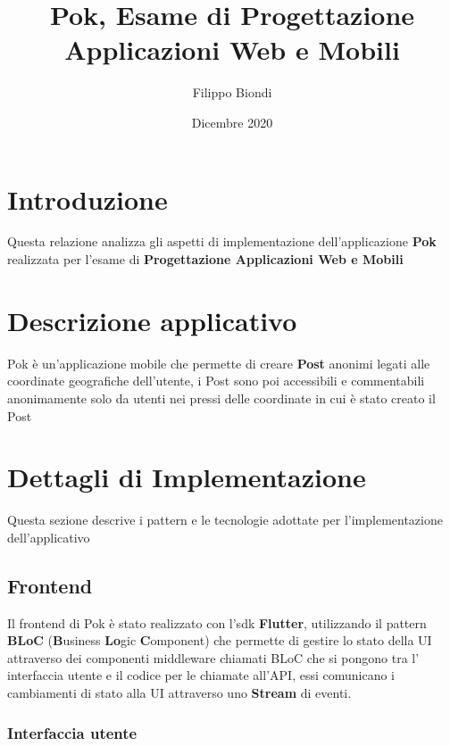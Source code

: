 \documentclass[a4paper]{article}
\title{Pok, Esame di Progettazione Applicazioni Web e Mobili}
\author{Filippo Biondi}
\date{Dicembre 2020}
\begin{document}
\maketitle

\renewcommand{\contentsname}{Contenuti}
\tableofcontents

\section{Introduzione}

Questa relazione analizza gli aspetti di implementazione dell'applicazione \textbf{Pok} realizzata per l'esame di \textbf{Progettazione Applicazioni Web e Mobili}

\section{Descrizione applicativo}

Pok è un'applicazione mobile che permette di creare \textbf{Post} anonimi legati alle coordinate geografiche dell'utente, i Post sono poi accessibili e commentabili anonimamente solo da utenti nei pressi delle coordinate in cui è stato creato il Post   

\section{Dettagli di Implementazione}

Questa sezione descrive i pattern e le tecnologie adottate per l'implementazione dell'applicativo

\newpage

\subsection{Frontend}

Il frontend di Pok è stato realizzato con l'sdk \textbf{Flutter}, utilizzando il pattern \textbf{BLoC} (\textbf{B}usiness \textbf{Lo}gic \textbf{C}omponent) che permette di gestire lo stato della UI attraverso dei componenti middleware 
chiamati BLoC che si pongono tra l' interfaccia utente e il codice per le chiamate all'API, essi comunicano i cambiamenti di stato alla UI attraverso uno \textbf{Stream} di eventi.

\subsubsection{Interfaccia utente}
\end{document}
